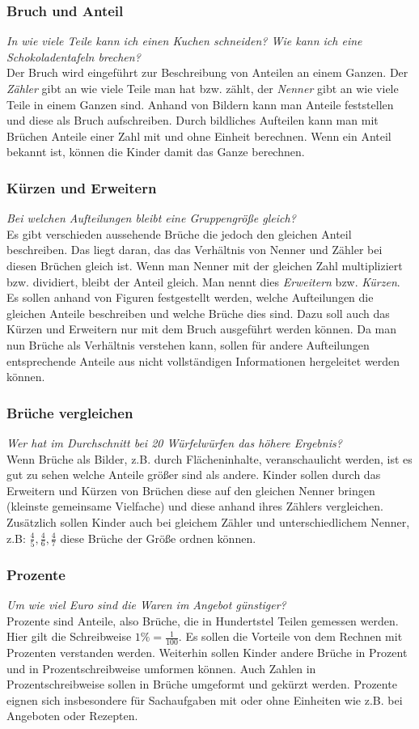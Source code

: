 \documentclass{article}
\begin{document}
\subsubsection*{Bruch und Anteil}
\textit{In wie viele Teile kann ich einen Kuchen schneiden? Wie kann ich eine Schokoladentafeln brechen?} \\
Der Bruch wird eingeführt zur Beschreibung von Anteilen an einem Ganzen.
Der \textit{Zähler} gibt an wie viele Teile man hat bzw. zählt, der \textit{Nenner} gibt an wie viele Teile in einem Ganzen sind.
Anhand von Bildern kann man Anteile feststellen und diese als Bruch aufschreiben.
Durch bildliches Aufteilen kann man mit Brüchen Anteile einer Zahl mit und ohne Einheit berechnen.
Wenn ein Anteil bekannt ist, können die Kinder damit das Ganze berechnen.
\subsubsection*{Kürzen und Erweitern}
\textit{Bei welchen Aufteilungen bleibt eine Gruppengröße gleich? }\\
Es gibt verschieden aussehende Brüche die jedoch den gleichen Anteil beschreiben. Das liegt daran, das das Verhältnis von Nenner und Zähler bei diesen Brüchen gleich ist.
Wenn man Nenner mit der gleichen Zahl multipliziert bzw. dividiert, bleibt der Anteil gleich. Man nennt dies \textit{Erweitern} bzw. \textit{Kürzen}.
Es sollen anhand von Figuren festgestellt werden, welche Aufteilungen die gleichen Anteile beschreiben und welche Brüche dies sind. Dazu soll auch das Kürzen und Erweitern nur mit dem Bruch ausgeführt werden können.
Da man nun Brüche als Verhältnis verstehen kann, sollen für andere Aufteilungen entsprechende Anteile aus nicht vollständigen Informationen hergeleitet werden können.
\subsubsection*{Brüche vergleichen}
\textit{Wer hat im Durchschnitt bei 20 Würfelwürfen das höhere Ergebnis?}\\
Wenn Brüche als Bilder, z.B. durch Flächeninhalte, veranschaulicht werden, ist es gut zu sehen welche Anteile größer sind als andere.
Kinder sollen durch das Erweitern und Kürzen von Brüchen diese auf den gleichen Nenner bringen (kleinste gemeinsame Vielfache) und diese anhand ihres Zählers vergleichen.
Zusätzlich sollen Kinder auch bei gleichem Zähler und unterschiedlichem Nenner, z.B: $\frac{4}{5}, \frac{4}{6}, \frac{4}{7}$ diese Brüche der Größe ordnen können.
\subsubsection*{Prozente}
\textit{Um wie viel Euro sind die Waren im Angebot günstiger?}\\
Prozente sind Anteile, also Brüche, die in Hundertstel Teilen gemessen werden. Hier gilt die Schreibweise $1\% = \frac{1}{100}$.
Es sollen die Vorteile von dem Rechnen mit Prozenten verstanden werden. 
Weiterhin sollen Kinder andere Brüche in Prozent und in Prozentschreibweise umformen können. Auch Zahlen in Prozentschreibweise sollen in Brüche umgeformt und gekürzt werden.
Prozente eignen sich insbesondere für Sachaufgaben mit oder ohne Einheiten wie z.B. bei Angeboten oder Rezepten.
\end{document}
